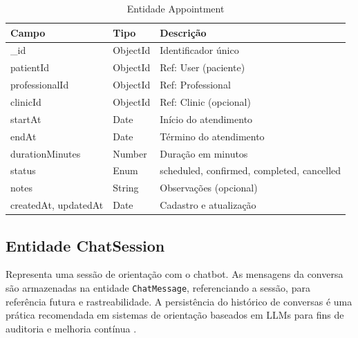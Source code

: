 \begin{table}[H]
  \centering
  \caption{Entidade Appointment}
  \label{tab:entity-appointment}
  \begin{tabular}{p{3.8cm}p{2.5cm}p{5.2cm}}
    \toprule
    \textbf{Campo} &
    \textbf{Tipo} &
    \textbf{Descrição} \\
    \midrule
    \_id             & ObjectId & Identificador único \\
    patientId        & ObjectId & Ref: User (paciente) \\
    professionalId   & ObjectId & Ref: Professional \\
    clinicId         & ObjectId & Ref: Clinic (opcional) \\
    startAt          & Date     & Início do atendimento \\
    endAt            & Date     & Término do atendimento \\
    durationMinutes  & Number   & Duração em minutos \\
    status           & Enum     & scheduled, confirmed,
                                  completed, cancelled \\
    notes            & String   & Observações (opcional) \\
    createdAt, updatedAt & Date & Cadastro e atualização \\
    \bottomrule
  \end{tabular}
\end{table}

\subsection{Entidade ChatSession}
\label{subsec:entity-chat}

Representa uma sessão de orientação com o chatbot.
As mensagens da conversa são armazenadas na entidade
\texttt{ChatMessage}, referenciando a sessão, para
referência futura e rastreabilidade. A persistência
do histórico de conversas é uma prática recomendada
em sistemas de orientação baseados em LLMs para fins
de auditoria e melhoria contínua \cite{huo2025}.

